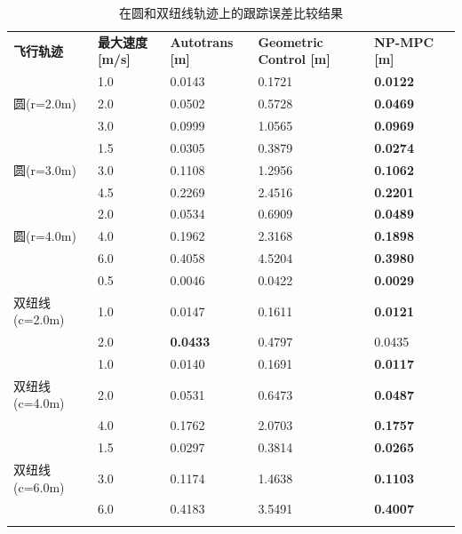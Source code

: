\documentclass[lang=chs, degree=master, blindreview=false, winfonts=true]{yanputhesis}
\begin{document}
\begin{table}[!ht]
    \caption{在圆和双纽线轨迹上的跟踪误差比较结果}
    \label{Table10}
    \centering
    \renewcommand\arraystretch{1.5} %
    \begin{tabular}{m{3cm}<{\centering} m{2.5cm}<{\centering} m{2.5cm}<{\centering} m{2.5cm}<{\centering} m{2.5cm}<{\centering} m{2.5cm}<{\centering}}
        \Xhline{1.pt}
        \textbf{飞行轨迹} & \textbf{最大速度 [m/s]} & \textbf{Autotrans [m]} & \textbf{Geometric Control [m]} & \textbf{NP-MPC [m]} \\
        \Xhline{1.pt}
        ~  & 1.0 & 0.0143 & 0.1721 & \textbf{0.0122} \\ 
        圆(r=2.0m)  & 2.0 & 0.0502 & 0.5728 & \textbf{0.0469} \\ 
        ~  & 3.0 & 0.0999 & 1.0565 & \textbf{0.0969} \\ \hline    
    	~ & 1.5 & 0.0305 & 0.3879 & \textbf{0.0274} \\ 
        圆(r=3.0m)  & 3.0 & 0.1108 & 1.2956 & \textbf{0.1062} \\ 
        ~  & 4.5 & 0.2269 & 2.4516 & \textbf{0.2201} \\ \hline    
        ~  & 2.0 & 0.0534 & 0.6909 & \textbf{0.0489} \\ 
        圆(r=4.0m) & 4.0 & 0.1962 & 2.3168 & \textbf{0.1898} \\ 
        ~  & 6.0 & 0.4058 & 4.5204 & \textbf{0.3980} \\ \hline    
        ~  & 0.5 & 0.0046 & 0.0422 & \textbf{0.0029} \\ 
        双纽线 (c=2.0m)  & 1.0 & 0.0147 & 0.1611 & \textbf{0.0121} \\ 
        ~  & 2.0 & \textbf{0.0433} & 0.4797 & {0.0435} \\ \hline    
        ~  & 1.0 & 0.0140 & 0.1691 & \textbf{0.0117} \\ 
        双纽线 (c=4.0m)  & 2.0 & 0.0531 & 0.6473 & \textbf{0.0487} \\ 
        ~ &  4.0 & 0.1762 & 2.0703 & \textbf{0.1757} \\ \hline    
        ~ &  1.5 & 0.0297 & 0.3814 & \textbf{0.0265} \\ 
        双纽线 (c=6.0m) & 3.0 & 0.1174 & 1.4638 & \textbf{0.1103} \\ 
         ~ & 6.0 & 0.4183 & 3.5491 & \textbf{0.4007} \\ \hline        \Xhline{1.pt}
    \end{tabular}
\end{table}
\end{document}
